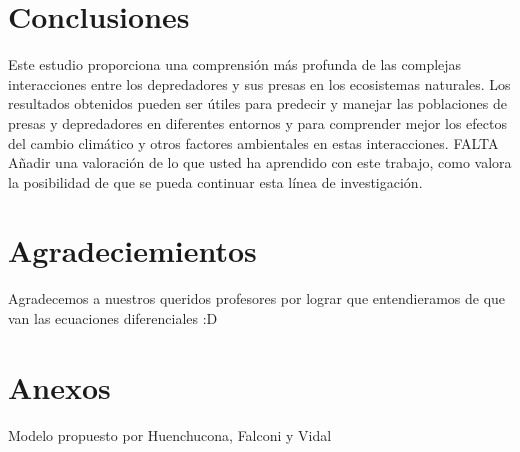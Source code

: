 \documentclass{wscpaperproc}
\theoremstyle{wsc}
\begin{document}
\section*{Conclusiones}
Este estudio proporciona una comprensi\'on más profunda de las complejas interacciones entre los depredadores y sus presas en
los ecosistemas naturales. Los resultados obtenidos pueden ser \'utiles para predecir y manejar las poblaciones de presas y
depredadores en diferentes entornos y para comprender mejor los efectos del cambio clim\'atico y otros factores ambientales
en estas interacciones. FALTA Añadir una valoración de lo que usted ha aprendido con este trabajo, como valora la
posibilidad de que se pueda continuar esta línea de investigación.



\printbibliography[heading=Referencias, type=article]
\renewcommand{\theenumiv}{}
\printbibliography[heading=Bibliografía, type=book, resetnumbers=true]
\nocite{edwards_differential_2008}



\section*{Agradeciemientos}
Agradecemos a nuestros queridos profesores por lograr que entendieramos de que van las ecuaciones diferenciales :D

\appendix

\section{Anexos} \label{app:Anexos}

\begin{center}
	Modelo propuesto por Huenchucona, Falconi y Vidal
	\\
\end{center}
\end{document}
